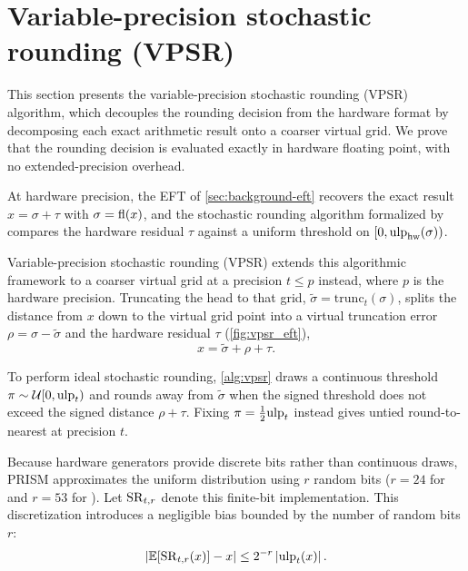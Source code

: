 \section{Variable-precision stochastic rounding (VPSR)}
\label{sec:vpsr}

This section presents the variable-precision stochastic rounding (VPSR) algorithm, which decouples the rounding decision from the hardware format by decomposing each exact arithmetic result onto a coarser virtual grid. We prove that the rounding decision is evaluated exactly in hardware floating point, with no extended-precision overhead.

At hardware precision, the EFT of \cref{sec:background-eft} recovers the exact result $x = \sigma + \tau$ with $\sigma = \mathrm{fl}(x)$, and the stochastic rounding algorithm formalized by \citet{fasi2021algorithms} compares the hardware residual $\tau$ against a uniform threshold on $[0, \mathrm{ulp}_{\rm hw}(\sigma))$.

Variable-precision stochastic rounding (VPSR) extends this algorithmic framework to a coarser virtual grid at a precision $t \le p$ instead, where $p$ is the hardware precision. Truncating the
head to that grid, $\tilde{\sigma} = \mathrm{trunc}_t(\sigma)$, splits the
distance from $x$ down to the virtual grid point into a virtual truncation error
$\rho = \sigma - \tilde{\sigma}$ and the hardware residual $\tau$
(\cref{fig:vpsr_eft}),
\begin{equation*}
  x = \tilde{\sigma} + \rho + \tau .
\end{equation*}

To perform ideal stochastic rounding, \cref{alg:vpsr} draws a continuous threshold
$\pi \sim \mathcal{U}[0, \mathrm{ulp}_t)$ and rounds away from $\tilde\sigma$ when the
signed threshold does not exceed the signed distance $\rho+\tau$. Fixing
$\pi = \tfrac12\mathrm{ulp}_t$ instead gives untied round-to-nearest at
precision $t$.

Because hardware generators provide discrete bits rather than continuous draws, PRISM approximates the uniform distribution using $r$ random bits ($r=24$ for  and $r=53$ for ). Let $\mathrm{SR}_{t,r}$ denote this finite-bit implementation. This discretization introduces a negligible bias bounded by the number of random bits $r$:
\begin{equation*}
  \left\lvert \mathbb{E}[\mathrm{SR}_{t,r}(x)]-x\right\rvert\le 2^{-r}\left\lvert \mathrm{ulp}_t(x)\right\rvert.
\end{equation*}

